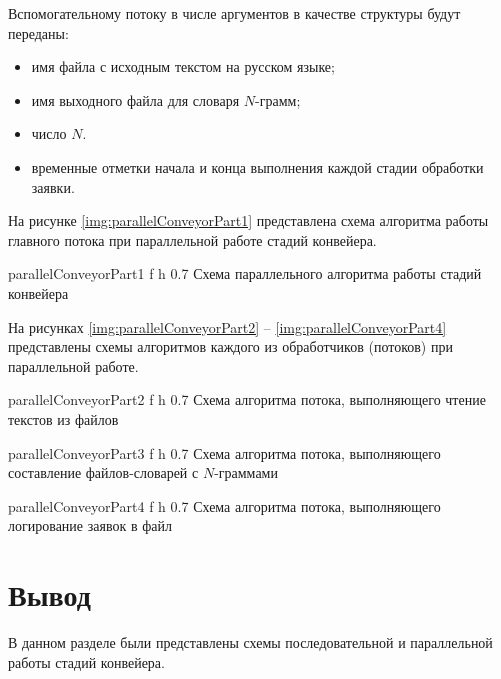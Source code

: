 Вспомогательному потоку в числе аргументов в качестве структуры будут переданы:

\begin{itemize}[label*=--]
	\item имя файла с исходным текстом на русском языке;
	\item имя выходного файла для словаря $N$-грамм;
	\item число $N$.
	\item временные отметки начала и конца выполнения каждой стадии обработки заявки.
\end{itemize}

На рисунке \ref{img:parallelConveyorPart1} представлена схема алгоритма работы главного потока при параллельной работе стадий конвейера.

{parallelConveyorPart1} %
{f} %
{h} %
{0.7\textwidth} %
{Схема параллельного алгоритма работы стадий конвейера} %

\clearpage

На рисунках \ref{img:parallelConveyorPart2} -- \ref{img:parallelConveyorPart4} представлены схемы алгоритмов каждого из обработчиков (потоков) при параллельной работе.

{parallelConveyorPart2} %
{f} %
{h} %
{0.7\textwidth} %
{Схема алгоритма потока, выполняющего чтение текстов из файлов} %

{parallelConveyorPart3} %
{f} %
{h} %
{0.7\textwidth} %
{Схема алгоритма потока, выполняющего составление файлов-словарей с $N$-граммами} %

{parallelConveyorPart4} %
{f} %
{h} %
{0.7\textwidth} %
{Схема алгоритма потока, выполняющего логирование заявок в файл} %

\clearpage

\section*{Вывод}

В данном разделе были представлены схемы последовательной и параллельной работы стадий конвейера.



